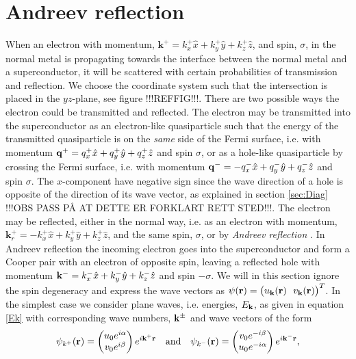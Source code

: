 \section{Andreev reflection} \label{sec:Andreev}
When an electron with momentum, $\mathbf{k}^+ = k^+_x\hat{x} + k^+_y\hat{y}+k^+_z\hat{z}$, and spin, $\sigma$, in the normal metal is propagating towards the interface between the normal metal and a superconductor, it will be scattered with certain probabilities of transmission and reflection. We choose the coordinate system such that the intersection is placed in the $yz$-plane, see figure !!!REFFIG!!!. There are two possible ways the electron could be transmitted and reflected. The electron may be transmitted into the superconductor as an electron-like quasiparticle such that the energy of the transmitted quasiparticle is on the \textit{same} side of the Fermi surface, i.e. with momentum $\mathbf{q}^+ =  q^+_x\hat{x} + q^+_y\hat{y}+q^+_z\hat{z}$ and spin $\sigma$, or as a hole-like quasiparticle by crossing the Fermi surface, i.e. with momentum $\mathbf{q}^- =  -q^-_x\hat{x} +q^-_y\hat{y} + q^-_z\hat{z}$ and spin $\sigma$. The $x$-component have negative sign since the wave direction of a hole is opposite of the direction of its wave vector, as explained in section \ref{sec:Diag} !!!OBS PASS PÅ AT DETTE ER FORKLART RETT STED!!!. The electron may be reflected, either in the normal way, i.e. as an electron with momentum, $\mathbf{k}_r^+ =  -k^+_x\hat{x} + k^+_y\hat{y}+k^+_z\hat{z}$, and the same spin, $\sigma$, or by \textit{Andreev reflection} \cite{andreev64}. In Andreev reflection the incoming electron goes into the superconductor and form a Cooper pair with an electron of opposite spin, leaving a reflected hole with momentum $\mathbf{k}^- = k^-_x\hat{x} + k^-_y\hat{y}+k^-_z\hat{z}$ and spin $-\sigma$. We will in this section ignore the spin degeneracy and express the wave vectors as $\psi(\mathbf{r}) = \big( u_{\mathbf{k}}(\mathbf{r}) \ \ v_{\mathbf{k}}(\mathbf{r})\big)^T$. In the simplest case we consider plane waves, i.e. energies, $E_{\mathbf{k}}$, as given in equation \eqref{Ek} with corresponding wave numbers, $\mathbf{k}^\pm$ and wave vectors of the form \cite{BTK82}
\begin{equation}
    \psi_{k^+}(\mathbf{r}) =
    \begin{pmatrix}
        u_0e^{i\alpha} \\ v_0e^{i\beta}
    \end{pmatrix}
    e^{i\mathbf{k}^+\mathbf{r}}
    \quad \mathrm{and} \quad
    \psi_{k^-}(\mathbf{r}) =
    \begin{pmatrix}
        v_0e^{-i\beta} \\ u_0e^{-i\alpha}
    \end{pmatrix}
    e^{i\mathbf{k}^-\mathbf{r}},
\end{equation}
